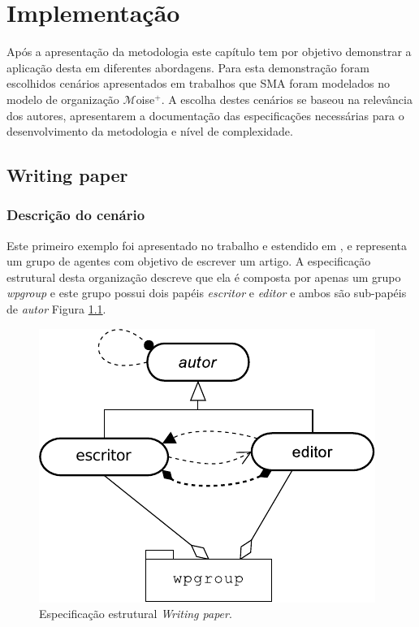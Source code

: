 \chapter{Implementação}

Após a apresentação da metodologia este capítulo tem por objetivo demonstrar a aplicação desta em diferentes abordagens. Para esta demonstração foram escolhidos cenários apresentados em trabalhos que SMA foram modelados no modelo de organização $\mathcal{M}$oise$^{+}$. A escolha destes cenários se baseou na relevância dos autores, apresentarem a documentação das especificações necessárias para o desenvolvimento da metodologia e nível de complexidade.

\section{Writing paper}

\subsection{Descrição do cenário}

Este primeiro exemplo foi apresentado no trabalho \cite{kitio2008organisational} e estendido em \cite{hubner2011normative}, e representa um grupo de agentes com objetivo de escrever um artigo. A especificação estrutural desta organização descreve que ela é composta por apenas um grupo \textit{wpgroup} e este grupo possui dois papéis \textit{escritor} e \textit{editor} e ambos são sub-papéis de \textit{autor} Figura \ref{fig:writing-paper-estrutural}.
    
\begin{figure}[ht]
\centering
\includegraphics[scale=0.7]{imagens/5-writing-paper-estrutural.pdf}
\caption{Especificação estrutural \textit{Writing paper}. \cite{hubner2011normative}}
\label{fig:writing-paper-estrutural}
\end{figure}
    
